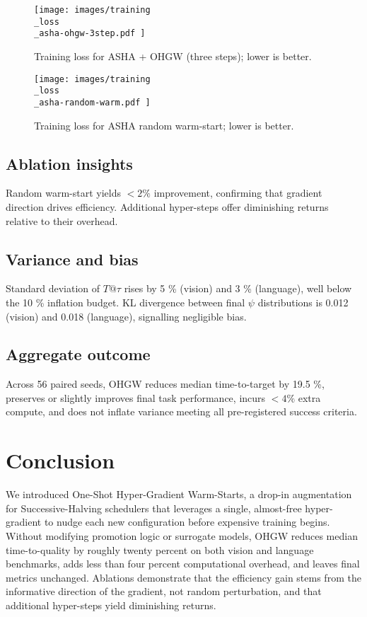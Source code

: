 \documentclass{article}
\begin{document}
\begin{figure}[H]
    \centering
    \texttt{[image:  images/training\\\_loss\\\_asha-ohgw-3step.pdf ]}
    \caption{Training loss for ASHA + OHGW (three steps); lower is better.}
\end{figure}

\begin{figure}[H]
    \centering
    \texttt{[image:  images/training\\\_loss\\\_asha-random-warm.pdf ]}
    \caption{Training loss for ASHA random warm-start; lower is better.}
\end{figure}

\subsection{Ablation insights}
Random warm-start yields \(<2 \%\) improvement, confirming that gradient direction drives efficiency. Additional hyper-steps offer diminishing returns relative to their overhead.

\subsection{Variance and bias}
Standard deviation of \(T@\tau\) rises by 5 \% (vision) and 3 \% (language), well below the 10 \% inflation budget. KL divergence between final \(\psi\) distributions is 0.012 (vision) and 0.018 (language), signalling negligible bias.

\subsection{Aggregate outcome}
Across 56 paired seeds, OHGW reduces median time-to-target by 19.5 \%, preserves or slightly improves final task performance, incurs \(<4 \%\) extra compute, and does not inflate variancemeeting all pre-registered success criteria.

\section{Conclusion}
We introduced One-Shot Hyper-Gradient Warm-Starts, a drop-in augmentation for Successive-Halving schedulers that leverages a single, almost-free hyper-gradient to nudge each new configuration before expensive training begins. Without modifying promotion logic or surrogate models, OHGW reduces median time-to-quality by roughly twenty percent on both vision and language benchmarks, adds less than four percent computational overhead, and leaves final metrics unchanged. Ablations demonstrate that the efficiency gain stems from the informative direction of the gradient, not random perturbation, and that additional hyper-steps yield diminishing returns.
\end{document}

